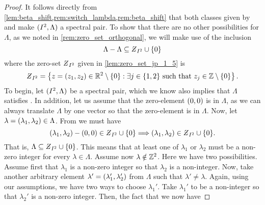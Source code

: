 \documentclass[../thesis.tex]{subfiles}
\begin{document}

\begin{proof}
    It follows directly from \cref{lem:beta_shift,rem:switch_lambda,rem:beta_shift} that both classes given by  and  make $(I^2,\Lambda)$ a spectral pair. To show that there are no other possibilities for $\Lambda$, as we noted in \cref{rem:zero_set_orthogonal}, we will make use of the inclusion
    \begin{equation}\label{eq:inclusion_dim_2}
        \Lambda - \Lambda \subseteq \Zstroke_{I^2} \cup \braq{0}
    \end{equation}
    where the zero-set $\Zstroke_{I^2}$ given in \cref{lem:zero_set_jp_1_5} is
    \begin{equation*}\label{eq:zeroset_dim_2}
        \Zstroke_{I^2} = \braqMed{z = \brac{z_1,z_2} \in \R^2\setminus \braqMed{0} : \exists \space j \in \braq{1,2} \text{ such that } z_j \in \intnozero}.
    \end{equation*}
    To begin, let $(I^2,\Lambda)$ be a spectral pair, which we know also implies that $\Lambda$ satisfies . In addition, let us assume that the zero-element $(0,0)$ is in $\Lambda$, as we can always translate $\Lambda$ by one  vector so that the zero-element is in $\Lambda$. Now, let $\lambda = (\lambda_1,\lambda_2) \in \Lambda$. From  we must have
    \begin{equation*}  %
        \bracMed{\lambda_1, \lambda_2} - \bracMed{0,0} \in \Zstroke_{I^2} \cup \braq{0} \Longrightarrow \brac{\lambda_1, \lambda_2} \in \Zstroke_{I^2} \cup \braq{0}.
    \end{equation*}
    That is, $\Lambda \subseteq \Zstroke_{I^2} \cup \braq{0}$. This means that at least one of $\lambda_1$ or $\lambda_2$ must be a non-zero integer for every $\lambda \in \Lambda$. %
    Assume now $\lambda\notin \mathbb{Z}^2$. Here we have two possibilities. Assume first that $\lambda_1$ is a non-zero integer so that $\lambda_2$ is a non-integer. Now, take another arbitrary element $\lambda' = (\lambda_1',\lambda_2')$ from $\Lambda$ such that $\lambda'\neq \lambda$. Again, using our assumptions, we have two ways to choose $\lambda_1'$. Take $\lambda_1'$ to be a non-integer so that $\lambda_2'$ is a non-zero integer. Then, the fact that we now have 

\end{proof}
\end{document}
